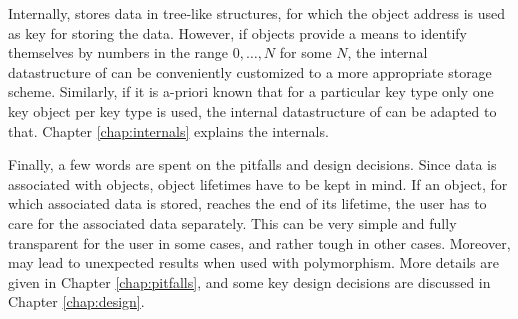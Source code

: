 Internally, {\ViennaData} stores data in tree-like structures, for which the object address is used as key for storing the data. 
However, if objects provide a means to identify themselves by numbers in the range $0, \ldots, N$ for some $N$, the internal datastructure of {\ViennaData} can be 
conveniently customized to a more appropriate storage scheme. Similarly, if it is a-priori known that for a particular key type only one key object per key type is used, the
internal datastructure of {\ViennaData} can be adapted to that. Chapter \ref{chap:internals} explains the internals.

Finally, a few words are spent on the pitfalls and design decisions. Since data is associated with objects, object lifetimes have to be kept in mind.
If an object, for which associated data is stored, reaches the end of its lifetime, the user has to care for the associated data separately.
This can be very simple and fully transparent for the user in some cases, and rather tough in other cases. Moreover, {\ViennaData} may lead to unexpected results when used with polymorphism. More details are given in Chapter \ref{chap:pitfalls}, and some key design decisions are discussed in Chapter \ref{chap:design}. 